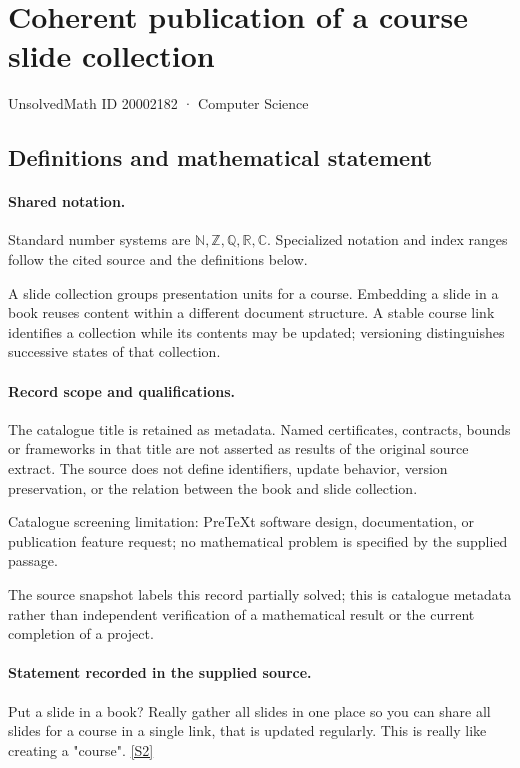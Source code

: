\documentclass[11pt]{article}
\newcommand{\sref}[2]{\hyperlink{source:#1:#2}{[S#2]}}
\begin{document}
\setcounter{section}{20002181}
\section{Coherent publication of a course slide collection}\label{20002182}
{\small\sffamily UnsolvedMath ID 20002182 · Computer Science}
\subsection{Definitions and mathematical statement}

\paragraph{Shared notation.}Standard number systems are $\mathbb N,\mathbb Z,\mathbb Q,\mathbb R,\mathbb C$. Specialized notation and index ranges follow the cited source and the definitions below.


A slide collection groups presentation units for a course. Embedding a slide in a book reuses content within a different document structure. A stable course link identifies a collection while its contents may be updated; versioning distinguishes successive states of that collection.
\paragraph{Record scope and qualifications.}
The catalogue title is retained as metadata. Named certificates, contracts, bounds or frameworks in that title are not asserted as results of the original source extract.
The source does not define identifiers, update behavior, version preservation, or the relation between the book and slide collection.

Catalogue screening limitation: PreTeXt software design, documentation, or publication feature request; no mathematical problem is specified by the supplied passage.

The source snapshot labels this record partially solved; this is catalogue metadata rather than independent verification of a mathematical result or the current completion of a project.
\paragraph{Statement recorded in the supplied source.}
Put a slide in a book? Really gather all slides in one place so you can share all slides for a course in a single link, that is updated regularly. This is really like creating a "course". \sref{20002182}{2}
\end{document}

